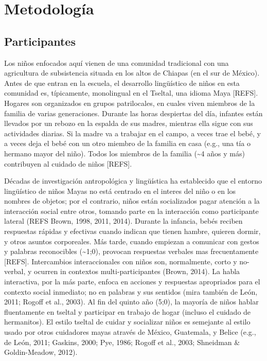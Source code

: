 \documentclass[
  english,
  ,man,floatsintext]{apa6}
\begin{document}
\hypertarget{methods}{%
\section{Metodología}\label{methods}}

\hypertarget{methods-participants}{%
\subsection{Participantes}\label{methods-participants}}

Los niños enfocados aquí vienen de una comunidad tradicional con una agricultura de subsistencia situada en los altos de Chiapas (en el sur de México). Antes de que entran en la escuela, el desarrollo lingüístico de niños en esta comunidad es, típicamente, monolingual en el Tseltal, una idioma Maya {[}REFS{]}. Hogares son organizados en grupos patrilocales, en cuales viven miembros de la familia de varias generaciones. Durante las horas despiertas del día, infantes están llevados por un rebozo en la espalda de sus madres, mientras ella sigue con sus actividades diarias. Si la madre va a trabajar en el campo, a veces trae el bebé, y a veces deja el bebé con un otro miembro de la familia en casa (e.g., una tía o hermano mayor del niño). Todos los miembros de la familia (\textasciitilde4 años y más) contribuyen al cuidado de niños {[}REFS{]}.

Décadas de investigación antropológica y lingüística ha establecido que el entorno lingüístico de niños Mayas no está centrado en el interes del niño o en los nombres de objetos; por el contrario, niños están socializados pagar atención a la interacción social entre otros, tomando parte en la interacción como participante lateral (REFS Brown, 1998, 2011, 2014). Durante la infancia, bebés reciben respuestas rápidas y efectivas cuando indican que tienen hambre, quieren dormir, y otros asuntos corporeales. Más tarde, cuando empiezan a comunicar con gestos y palabras reconocibles (\textasciitilde1;0), provocan respuestas verbales mas frecuentamente {[}REFS{]}. Intercambios interaccionales con niños son, normalmente, corto y no-verbal, y ocurren in contextos multi-participantes (Brown, 2014). La habla interactiva, por la más parte, enfoca en acciones y respuestas apropriados para el contexto social inmediato; no en palabras y sus sentidos (mira también de León, 2011; Rogoff et al., 2003). Al fin del quinto año (5;0), la mayoría de niños hablar fluentamente en tseltal y participar en trabajo de hogar (incluso el cuidado de hermanitos). El estilo tseltal de cuidar y socializar niños es semejante al estilo usado por otros cuidadores mayas através de México, Guatemala, y Belice (e.g., de León, 2011; Gaskins, 2000; Pye, 1986; Rogoff et al., 2003; Shneidman \& Goldin-Meadow, 2012).
\end{document}
